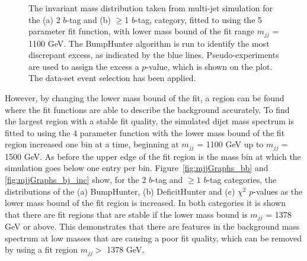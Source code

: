 \begin{figure}[!ht]
  \begin{center}
    \captionsetup[subfigure]{aboveskip=0pt,justification=centering}
  \end{center}
  \caption{ The invariant mass distribution taken from multi-jet simulation for the (a) 2 $b$-tag and (b) $\geq$1 $b$-tag,
    category, fitted to using the 5 parameter fit function, with lower mass bound of the fit range $m_{jj}$ = 1100 GeV.
    The BumpHunter algorithm is run to identify the most discrepant excess, as indicated by the blue lines.
    Pseudo-experiments are used to assign the excess a \mbox{$p$-value}, which is shown on the plot.
    The \summer{} data-set event selection has been applied.}
  \label{fig:Short_5para_1100_figure1}
\end{figure}

\FloatBarrier

However, by changing the lower mass bound of the fit,
a region can be found where the fit functions are able to describe the background accurately.
To find the largest region with a stable fit quality, the simulated dijet mass spectrum is
fitted to using the 4 parameter function with the lower mass bound of the fit region increased one bin at a time,
beginning at $m_{jj}$ = 1100 GeV up to $m_{jj}$ = 1500 GeV.
As before the upper edge of the fit region is the mass bin at which the simulation goes below one entry per bin.
Figure~\ref{fig:mjjGraphs_bb} and \ref{fig:mjjGraphs_bj_inc} show,
for the 2 $b$-tag and $\geq1$ $b$-tag categories, the distributions of the
(a) BumpHunter, (b) DeficitHunter and (c) $\chi^{2}$ \mbox{$p$-value}s as the lower mass bound of the fit region is increased.
In both categories it is shown that there are fit regions that are stable if the lower mass bound is $m_{jj}$ = 1378 GeV or above.
This demonstrates that there are features in the background mass spectrum at low masses that are causing a poor fit quality,
which can be removed by using a fit region $m_{jj} >$ 1378 GeV. 

